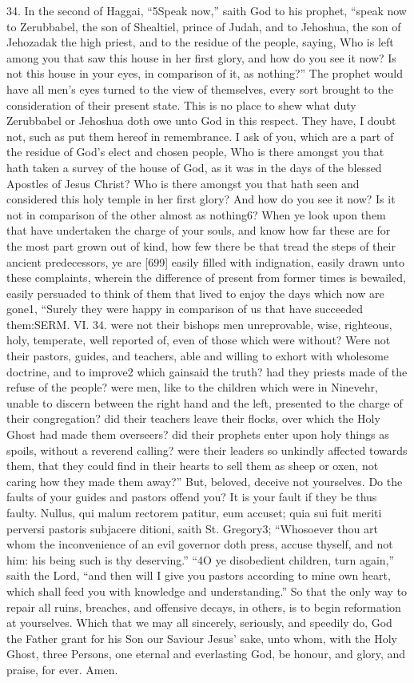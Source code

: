34. In the second of Haggai, “5Speak now,” saith God to his prophet, “speak now to Zerubbabel, the son of Shealtiel, prince of Judah, and to Jehoshua, the son of Jehozadak the high priest, and to the residue of the people, saying, Who is left among you that saw this house in her first glory, and how do you see it now? Is not this house in your eyes, in comparison of it, as nothing?” The prophet would have all men’s eyes turned to the view of themselves, every sort brought to the consideration of their present state. This is no place to shew what duty Zerubbabel or Jehoshua doth owe unto God in this respect. They have, I doubt not, such as put them hereof in remembrance. I ask of you, which are a part of the residue of God’s elect and chosen people, Who is there amongst you that hath taken a survey of the house of God, as it was in the days of the blessed Apostles of Jesus Christ? Who is there amongst you that hath seen and considered this holy temple in her first glory? And how do you see it now? Is it not in comparison of the other almost as nothing6? When ye look upon them that have undertaken the charge of your souls, and know how far these are for the most part grown out of kind, how few there be that tread the steps of their ancient predecessors, ye are [699] easily filled with indignation, easily drawn unto these complaints, wherein the difference of present from former times is bewailed, easily persuaded to think of them that lived to enjoy the days which now are gone1, “Surely they were happy in comparison of us that have succeeded them:SERM. VI. 34. were not their bishops men unreprovable, wise, righteous, holy, temperate, well reported of, even of those which were without? Were not their pastors, guides, and teachers, able and willing to exhort with wholesome doctrine, and to improve2 which gainsaid the truth? had they priests made of the refuse of the people? were men, like to the children which were in Ninevehr, unable to discern between the right hand and the left, presented to the charge of their congregation? did their teachers leave their flocks, over which the Holy Ghost had made them overseers? did their prophets enter upon holy things as spoils, without a reverend calling? were their leaders so unkindly affected towards them, that they could find in their hearts to sell them as sheep or oxen, not caring how they made them away?” But, beloved, deceive not yourselves. Do the faults of your guides and pastors offend you? It is your fault if they be thus faulty. Nullus, qui malum rectorem patitur, eum accuset; quia sui fuit meriti perversi pastoris subjacere ditioni, saith St. Gregory3; “Whosoever thou art whom the inconvenience of an evil governor doth press, accuse thyself, and not him: his being such is thy deserving.” “4O ye disobedient children, turn again,” saith the Lord, “and then will I give you pastors according to mine own heart, which shall feed you with knowledge and understanding.” So that the only way to repair all ruins, breaches, and offensive decays, in others, is to begin reformation at yourselves. Which that we may all sincerely, seriously, and speedily do, God the Father grant for his Son our Saviour Jesus’ sake, unto whom, with the Holy Ghost, three Persons, one eternal and everlasting God, be honour, and glory, and praise, for ever. Amen.


